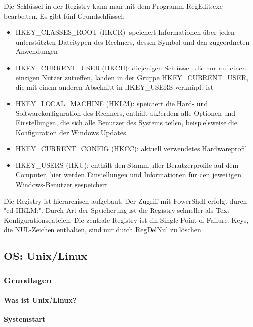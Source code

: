 Die Schlüssel in der Registry kann man mit dem Programm RegEdit.exe bearbeiten. Es gibt fünf Grundschlüssel:
\begin{itemize}
	\item HKEY\_CLASSES\_ROOT (HKCR): speichert Informationen über jeden unterstützten Dateitypen des Rechners, dessen Symbol und den zugeordneten Anwendungen
	\item HKEY\_CURRENT\_USER (HKCU): diejenigen Schlüssel, die nur auf einen einzigen Nutzer zutreffen, landen in der Gruppe HKEY\_CURRENT\_USER, die mit einem anderen Abschnitt in HKEY\_USERS verknüpft ist
	\item HKEY\_LOCAL\_MACHINE (HKLM): speichert die Hard- und Softwarekonfiguration des Rechners, enthält außerdem alle Optionen und Einstellungen, die sich alle Benutzer des Systems teilen, beispielsweise die Konfiguration der Windows Updates
	\item HKEY\_CURRENT\_CONFIG (HKCC): aktuell verwendetes Hardwareprofil
	\item HKEY\_USERS (HKU): enthält den Stamm aller Benutzerprofile auf dem Computer, hier werden Einstellungen und Informationen für den jeweiligen Windows-Benutzer gespeichert
\end{itemize}

Die Registry ist hierarchisch aufgebaut. Der Zugriff mit PowerShell erfolgt durch "cd HKLM:". Durch Art der Speicherung ist die Registry schneller als Text-Konfigurationsdateien. Die zentrale Registry ist ein Single Point of Failure. Keys, die NUL-Zeichen enthalten, sind nur durch RegDelNul zu löschen.


\subsection{OS: Unix/Linux}

\subsubsection{Grundlagen}

\paragraph{Was ist Unix/Linux?}


\paragraph{Systemstart}

